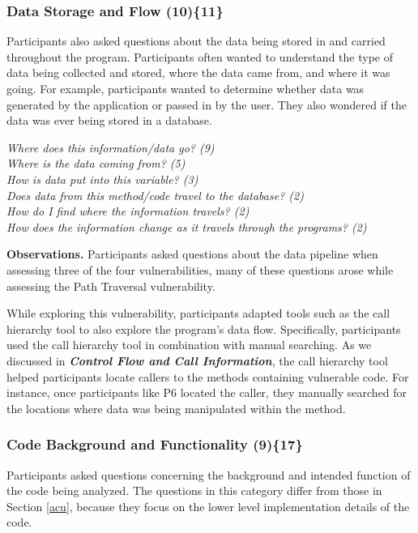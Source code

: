 \documentclass{acm_proc_article-sp}
\begin{document}
\subsubsection{\textbf{Data Storage and Flow (10)\{11\}}}\label{dsf}
Participants also asked questions about the data being stored in and carried throughout the program. 
Participants often wanted to understand the type of data being collected and stored, where the data came from, and where it was going. 
For example, participants wanted to determine whether data was generated by the application or passed in by the user. They also wondered if the data was ever being stored in a database.

\noindent\emph{Where does this information/data go? (9)} \\
\emph{Where is the data coming from? (5)} \\
\emph{How is data put into this variable? (3)} \\
\emph{Does data from this method/code travel to the database? (2)} \\
\emph{How do I find where the information travels? (2)} \\
\emph{How does the information change as it travels through the programs? (2)} 


\noindent\textbf{Observations.}
Participants asked questions about the data pipeline when assessing three of the four vulnerabilities, many of these questions arose while assessing the Path Traversal vulnerability. 

While exploring this vulnerability, participants adapted tools such as the call hierarchy tool to also explore the program's data flow. 
Specifically, participants used the call hierarchy tool in combination with manual searching. 
As we discussed in \emph{\textbf{Control Flow and Call Information}}, the call hierarchy tool helped participants locate callers to the methods containing vulnerable code.
For instance, once participants like P6 located the caller, they manually searched for the locations where data was being manipulated within the method.



\subsubsection{\textbf{Code Background and Functionality (9)\{17\}}}
\label{cbf}
Participants asked questions concerning the background and intended function of the code being analyzed. 
The questions in this category differ from those in Section \ref{acu}, because they focus on the lower level implementation details of the code.
\end{document}
